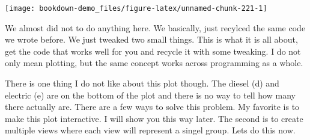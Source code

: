 \documentclass[]{book}
\newenvironment{Shaded}{\begin{snugshade}}{\end{snugshade}}
\newcommand{\CommentTok}[1]{\textcolor[rgb]{0.56,0.35,0.01}{\textit{#1}}}
\newcommand{\DataTypeTok}[1]{\textcolor[rgb]{0.13,0.29,0.53}{#1}}
\newcommand{\DecValTok}[1]{\textcolor[rgb]{0.00,0.00,0.81}{#1}}
\newcommand{\FloatTok}[1]{\textcolor[rgb]{0.00,0.00,0.81}{#1}}
\newcommand{\KeywordTok}[1]{\textcolor[rgb]{0.13,0.29,0.53}{\textbf{#1}}}
\newcommand{\NormalTok}[1]{#1}
\newcommand{\OperatorTok}[1]{\textcolor[rgb]{0.81,0.36,0.00}{\textbf{#1}}}
\newcommand{\StringTok}[1]{\textcolor[rgb]{0.31,0.60,0.02}{#1}}
\begin{document}
\begin{Shaded}
\end{Shaded}

\begin{center}\texttt{[image: bookdown-demo\_files/figure-latex/unnamed-chunk-221-1]} \end{center}

We almost did not to do anything here. We basically, just recylced the same code we wrote before. We just tweaked two small things. This is what it is all about, get the code that works well for you and recycle it with some tweaking. I do not only mean plotting, but the same concept works across programming as a whole.

There is one thing I do not like about this plot though. The diesel (d) and electric (e) are on the bottom of the plot and there is no way to tell how many there actually are. There are a few ways to solve this problem. My favorite is to make this plot interactive. I will show you this way later. The second is to create multiple views where each view will represent a singel group. Lets do this now.
\end{document}
